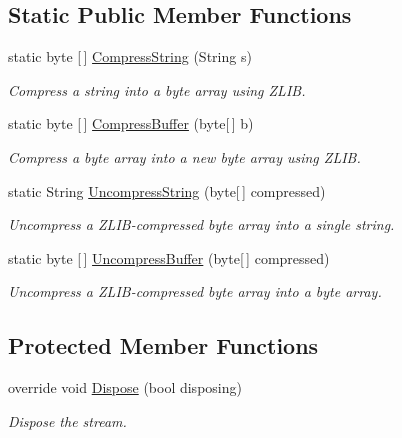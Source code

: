 \subsection*{Static Public Member Functions}
\begin{DoxyCompactItemize}
\item 
static byte \mbox{[}$\,$\mbox{]} \mbox{\hyperlink{class_super_tiled2_unity_1_1_ionic_1_1_zlib_1_1_zlib_stream_a1eacadb410038ea05e574eb2613659ff}{Compress\+String}} (String s)
\begin{DoxyCompactList}\small\item\em Compress a string into a byte array using Z\+L\+IB. \end{DoxyCompactList}\item 
static byte \mbox{[}$\,$\mbox{]} \mbox{\hyperlink{class_super_tiled2_unity_1_1_ionic_1_1_zlib_1_1_zlib_stream_aa7d8b91ad22da385b13a4b384ace934b}{Compress\+Buffer}} (byte\mbox{[}$\,$\mbox{]} b)
\begin{DoxyCompactList}\small\item\em Compress a byte array into a new byte array using Z\+L\+IB. \end{DoxyCompactList}\item 
static String \mbox{\hyperlink{class_super_tiled2_unity_1_1_ionic_1_1_zlib_1_1_zlib_stream_acc82ac42a15bc6f635d772abe3852785}{Uncompress\+String}} (byte\mbox{[}$\,$\mbox{]} compressed)
\begin{DoxyCompactList}\small\item\em Uncompress a Z\+L\+I\+B-\/compressed byte array into a single string. \end{DoxyCompactList}\item 
static byte \mbox{[}$\,$\mbox{]} \mbox{\hyperlink{class_super_tiled2_unity_1_1_ionic_1_1_zlib_1_1_zlib_stream_a9e368cfa1fa92b4c484816848f5cfd6a}{Uncompress\+Buffer}} (byte\mbox{[}$\,$\mbox{]} compressed)
\begin{DoxyCompactList}\small\item\em Uncompress a Z\+L\+I\+B-\/compressed byte array into a byte array. \end{DoxyCompactList}\end{DoxyCompactItemize}
\subsection*{Protected Member Functions}
\begin{DoxyCompactItemize}
\item 
override void \mbox{\hyperlink{class_super_tiled2_unity_1_1_ionic_1_1_zlib_1_1_zlib_stream_ae7e46e815fe6d5cd5777c4388a096ca2}{Dispose}} (bool disposing)
\begin{DoxyCompactList}\small\item\em Dispose the stream. \end{DoxyCompactList}\end{DoxyCompactItemize}
